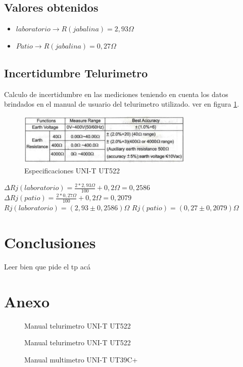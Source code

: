 \documentclass[12pt, letterpaper]{article}
\begin{document}
\subsection{Valores obtenidos}
\begin{itemize}
    \item $laboratorio \rightarrow R(jabalina)=2,93 \Omega$
    \item $Patio \rightarrow R(jabalina)=0,27 \Omega$
\end{itemize}

\subsection{Incertidumbre Telurimetro}
Calculo de incertidumbre en las mediciones teniendo en cuenta los datos brindados en el manual de usuario del telurimetro utilizado. ver en figura \ref{fig:epecificacion_telur}.
\begin{figure}[H]
	\centering
	\includegraphics[width=0.75\textwidth]{imagenes/especificaciones_telurimetro.png}
	\caption{Especificaciones UNI-T UT522}
	\label{fig:epecificacion_telur}
\end{figure}
$\Delta Rj(laboratorio)=\frac{2*2,93\Omega}{100}+0,2\Omega=0,2586$
\singlespacing
$\Delta Rj(patio)=\frac{2*0,27\Omega}{100}+0,2\Omega=0,2079$
\singlespacing
$Rj(laboratorio) = (2,93\pm0,2586)\Omega$
\singlespacing
$Rj(patio) = (0,27\pm0,2079)\Omega$


\section{Conclusiones}

Leer bien que pide el tp acá

\newpage
\section{Anexo}

\begin{figure}[H]
    \centering
    
    \caption{Manual telurimetro UNI-T UT522}
    \label{fig:manual_UT522}
\end{figure}
\newpage
\begin{figure}[H]
    \centering
    
    \caption{Manual telurimetro UNI-T UT522}
\end{figure}
\newpage
\begin{figure}[H]
    \centering
    
    \caption{Manual multimetro UNI-T UT39C+}
    \label{fig:manual_UT39c}
\end{figure}

\label{LastPage}
\end{document}
